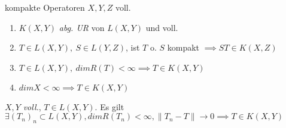 \begin{satz}{kompakte Operatoren}
  $X,Y,Z$ voll.
  \begin{enumerate}[label=(\roman*)]
    \item $K(X,Y)$ \textit{abg. UR} von $L(X,Y)$ und voll.
    \item $T\in L(X,Y),\ S\in L(Y,Z)$, ist $T$ o. $S$ kompakt
      $\implies ST \in K(X,Z)$
    \item $T \in L(X,Y),\ dimR(T) < \infty \implies T \in K(X,Y)$
    \item $dimX < \infty \implies T \in K(X,Y)$
  \end{enumerate}
\end{satz}

\begin{korrolar}
  $X,Y$ \textit{voll.}, $T \in L(X,Y)$. Es gilt
  $\exists (T_n)_n \subset L(X,Y), dimR(T_n)<\infty, \|T_n-T\| \to 0
  \implies T \in K(X,Y)$
\end{korrolar}
